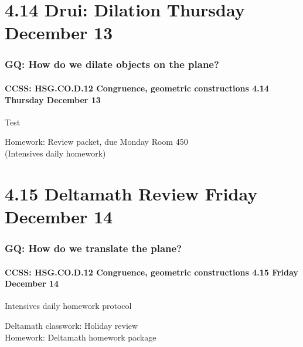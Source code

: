 \documentclass{beamer}
\begin{document}
  \section{4.14 Drui: Dilation Thursday December 13}
    \frame
    {
      \frametitle{GQ: How do we dilate objects on the plane?}
      \framesubtitle{CCSS: HSG.CO.D.12 Congruence, geometric constructions  \alert{4.14 Thursday December 13}}

      \begin{block}{\centering Test}
      \end{block} \vspace{0.5cm}
      Homework: Review packet, due Monday Room 450\\[0.5cm]
      (Intensives daily homework)
    }

  \section{4.15 Deltamath Review Friday December 14}
    \frame
    {
      \frametitle{GQ: How do we translate the plane?}
      \framesubtitle{CCSS: HSG.CO.D.12 Congruence, geometric constructions  \alert{4.15 Friday December 14}}

      \begin{block}{Intensives daily homework protocol}
      \end{block}
      Deltamath classwork: Holiday review\\[0.5cm]
      Homework: Deltamath homework package
    }
\end{document}
